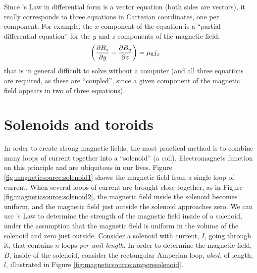 Since \ampere's Law in differential form is a vector equation (both sides are vectors), it really corresponds to three equations in Cartesian coordinates, one per component. For example, the $x$ component of the equation is a ``partial differential equation'' for the $y$ and $z$ components of the magnetic field:
\begin{align*}
\left(\frac{\partial B_z}{\partial y}-\frac{\partial B_y}{\partial z}\right) &=\mu_0j_x
\end{align*}
that is in general difficult to solve without a computer (and all three equations are required, as these are ``coupled'', since a given component of the magnetic field appears in two of three equations).





\section{Solenoids and toroids}
In order to create strong magnetic fields, the most practical method is to combine many loops of current together into a ``solenoid'' (a coil). Electromagnets function on this principle and are ubiquitous in our lives. Figure \ref{fig:magneticsource:solenoid1} shows the magnetic field from a single loop of current.  
When several loops of current are brought close together, as in Figure \ref{fig:magneticsource:solenoid2}, the magnetic field inside the solenoid becomes uniform, and the magnetic field just outside the solenoid approaches zero. 
We can use \ampere's Law to determine the strength of the magnetic field inside of a solenoid, under the assumption that the magnetic field is uniform in the volume of the solenoid and zero just outside. Consider a solenoid with current, $I$, going through it, that contains $n$ loops \textit{per unit length}. In order to determine the magnetic field, $B$, inside of the solenoid, consider the rectangular Amperian loop, $abcd$, of length, $l$, illustrated in Figure \ref{fig:magneticsource:amperesolenoid}.
